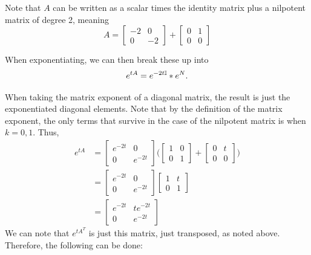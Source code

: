 \begin{solution}

    Note that $A$ can be written as a scalar times the identity matrix plus a nilpotent matrix of degree 2, meaning
    \[
    A = \begin{bmatrix}-2 &0\\ 0 &-2\end{bmatrix} + \begin{bmatrix}0 &1\\ 0 &0\end{bmatrix}
    \]

    When exponentiating, we can then break these up into
    \[
    e^{tA} = e^{-2t\mathbb{I}} * e^N.
    \]

    When taking the matrix exponent of a diagonal matrix, the result is just the exponentiated diagonal elements. Note that by the definition of the matrix exponent, the only terms that survive in the case of the nilpotent matrix is when $k = 0, 1$. Thus,
    \begin{align}
            e^{tA} &= \begin{bmatrix}e^{-2t} &0\\0 &e^{-2t}\end{bmatrix}\Bigg( \begin{bmatrix}1 &0 \\0 &1\end{bmatrix} + \begin{bmatrix}0 &t\\ 0 &0\end{bmatrix}\Bigg)\nonumber\\
            &= \begin{bmatrix}e^{-2t} &0\\0 &e^{-2t}\end{bmatrix}\begin{bmatrix}1 &t \\0 &1\end{bmatrix}\nonumber\\
            &= \begin{bmatrix}e^{-2t} &te^{-2t}\\ 0 &e^{-2t}\end{bmatrix}\nonumber
    \end{align}
    We can note that $e^{tA^T}$ is just this matrix, just transposed, as noted above. Therefore, the following can be done:


\end{solution}
